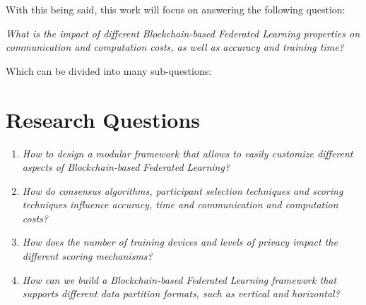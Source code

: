 With this being said, this work will focus on answering the following question:

\begin{center}
    \textit{What is the impact of different Blockchain-based Federated Learning properties on communication and computation costs, as well as accuracy and training time?}
\end{center}

Which can be divided into many sub-questions:

    
    

\section{Research Questions}

\todo{}

\begin{enumerate}
    \item \textit{How to design a modular framework that allows to easily customize different aspects of Blockchain-based Federated Learning?}
    
    \item \textit{How do consensus algorithms, participant selection techniques and scoring techniques influence accuracy, time and communication and computation costs?}
    
    \item \textit{How does the number of training devices and levels of privacy impact the different scoring mechanisms?}
    
    \item \textit{How can we build a Blockchain-based Federated Learning framework that supports different data partition formats, such as vertical and horizontal?}
\end{enumerate}

